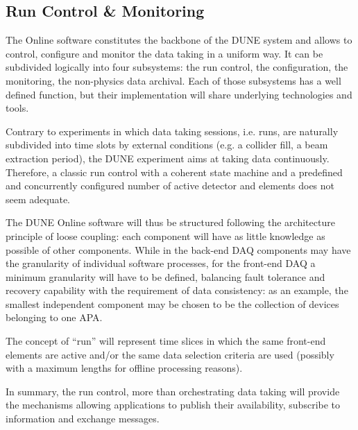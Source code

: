 
\subsection{Run Control \& Monitoring}
\label{sec:fd-daq-tcm}



The Online software constitutes the backbone of the DUNE 
system and allows to control, configure and monitor the data taking in
a uniform way.
It can be subdivided logically into four subsystems: the run control,
the configuration, the monitoring, the non-physics data archival.
Each of those subsystems has a well defined function, but their
implementation will share underlying technologies and tools.

Contrary to experiments in which data taking sessions, i.e. runs, are
naturally subdivided into time slots by external conditions (e.g. a
collider fill, a beam extraction period), the DUNE experiment aims at
taking data continuously.
Therefore, a classic run control with a coherent state machine and a
predefined and concurrently configured number of active detector and
 elements does not seem adequate. 

The DUNE Online software will thus be structured following the
architecture principle of loose coupling: each component will have as
little knowledge as possible of other components.
While in the back-end DAQ components may have the granularity of
individual software processes, for the front-end DAQ a minimum
granularity will have to be defined, balancing fault tolerance and
recovery capability with the requirement of data consistency: as an
example, the smallest independent component may be chosen to be the
collection of devices belonging to one APA.

The concept of ``run'' will represent time slices in which the same
front-end elements are active and/or the same data selection criteria
are used (possibly with a maximum lengths for offline processing
reasons). 

In summary, the run control, more than orchestrating data taking will
provide the mechanisms allowing  applications to publish
their availability, subscribe to information and exchange messages. 

